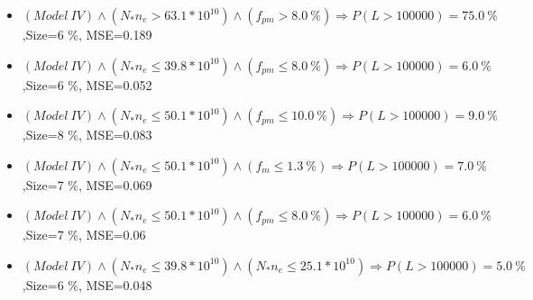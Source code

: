 \documentclass[numbered]{CSL}
\begin{document}
\begin{itemize}
\item $(Model~IV) \land (N_* n_e > 63.1 * 10^{10}) \land (f_{pm} > 8.0~\%) \Rightarrow P(L > 100 000) = 75.0~\%$,\hfill Size=6 \%, MSE=0.189
\item $(Model~IV) \land (N_* n_e \leq 39.8 * 10^{10}) \land (f_{pm} \leq 8.0~\%) \Rightarrow P(L > 100 000) = 6.0~\%$,\hfill Size=6 \%, MSE=0.052
\item $(Model~IV) \land (N_* n_e \leq 50.1 * 10^{10}) \land (f_{pm} \leq 10.0~\%) \Rightarrow P(L > 100 000) = 9.0~\%$,\hfill Size=8 \%, MSE=0.083
\item $(Model~IV) \land (N_* n_e \leq 50.1 * 10^{10}) \land (f_m \leq 1.3~\%) \Rightarrow P(L > 100 000) = 7.0~\%$,\hfill Size=7 \%, MSE=0.069
\item $(Model~IV) \land (N_* n_e \leq 50.1 * 10^{10}) \land (f_{pm} \leq 8.0~\%) \Rightarrow P(L > 100 000) = 6.0~\%$,\hfill Size=7 \%, MSE=0.06
\item $(Model~IV) \land (N_* n_e \leq 39.8 * 10^{10}) \land (N_* n_e \leq 25.1 * 10^{10}) \Rightarrow P(L > 100 000) = 5.0~\%$,\hfill Size=6 \%, MSE=0.048
\end{itemize}
\end{document}
